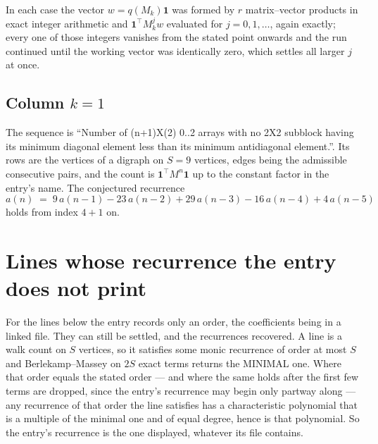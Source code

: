 \documentclass[11pt,a4paper]{article}
\theoremstyle{plain}
\theoremstyle{definition}
\begin{document}
In each case the vector $w=q(M_k)\mathbf{1}$ was formed by $r$ matrix--vector products in
exact integer arithmetic and $\mathbf{1}^{\!\top}M_k^{j}w$ evaluated for $j=0,1,\dots$,
again exactly; every one of those integers vanishes from the stated point onwards and the run
continued until the working vector was identically zero, which settles all larger $j$ at once.

\subsection*{Column $k$$=1$}
The sequence is ``Number of (n+1)X(2) 0..2 arrays with no 2X2 subblock having its minimum diagonal element less than its minimum antidiagonal element.''. Its rows are the vertices of a digraph on
$S=9$ vertices, edges being the admissible consecutive pairs, and the count is
$\mathbf{1}^{\!\top}M^{n}\mathbf{1}$ up to the constant factor in the entry's name.
The conjectured recurrence
\[
a(n)\;=\;9\,a(n-1) - 23\,a(n-2) + 29\,a(n-3) - 16\,a(n-4) + 4\,a(n-5)
\]
holds from index $4+1$ on.


\section{Lines whose recurrence the entry does not print}

For the lines below the entry records only an order, the coefficients being in a linked file.
They can still be settled, and the recurrences recovered. A line is a walk count on $S$
vertices, so it satisfies some monic recurrence of order at most $S$ and Berlekamp--Massey on
$2S$ exact terms returns the MINIMAL one. Where that order equals the stated order --- and
where the same holds after the first few terms are dropped, since the entry's recurrence may
begin only partway along --- any recurrence of that order the line satisfies has a
characteristic polynomial that is a multiple of the minimal one and of equal degree, hence is
that polynomial. So the entry's recurrence is the one displayed, whatever its file contains.
\end{document}
